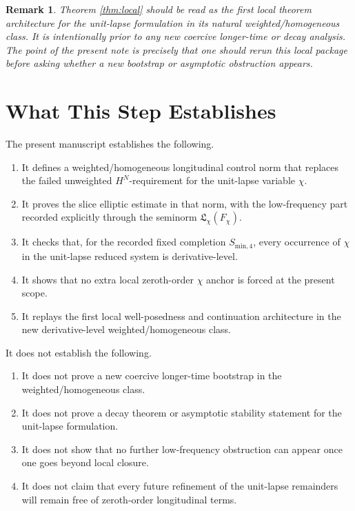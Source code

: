 \documentclass[11pt]{article}
\newtheorem{remark}{Remark}
\begin{document}
\begin{remark}
Theorem \ref{thm:local} should be read as the first local theorem architecture for the unit-lapse formulation in its natural weighted/homogeneous class. It is intentionally prior to any new coercive longer-time or decay analysis. The point of the present note is precisely that one should rerun this local package before asking whether a new bootstrap or asymptotic obstruction appears.
\end{remark}

\section{What This Step Establishes}

The present manuscript establishes the following.
\begin{enumerate}
    \item It defines a weighted/homogeneous longitudinal control norm that replaces the failed unweighted \(H^N\)-requirement for the unit-lapse variable \(\chi\).
    \item It proves the slice elliptic estimate in that norm, with the low-frequency part recorded explicitly through the seminorm \(\mathfrak L_\chi(F_\chi)\).
    \item It checks that, for the recorded fixed completion \(S_{\mathrm{min},4}\), every occurrence of \(\chi\) in the unit-lapse reduced system is derivative-level.
    \item It shows that no extra local zeroth-order \(\chi\) anchor is forced at the present scope.
    \item It replays the first local well-posedness and continuation architecture in the new derivative-level weighted/homogeneous class.
\end{enumerate}

It does not establish the following.
\begin{enumerate}
    \item It does not prove a new coercive longer-time bootstrap in the weighted/homogeneous class.
    \item It does not prove a decay theorem or asymptotic stability statement for the unit-lapse formulation.
    \item It does not show that no further low-frequency obstruction can appear once one goes beyond local closure.
    \item It does not claim that every future refinement of the unit-lapse remainders will remain free of zeroth-order longitudinal terms.
\end{enumerate}
\end{document}
